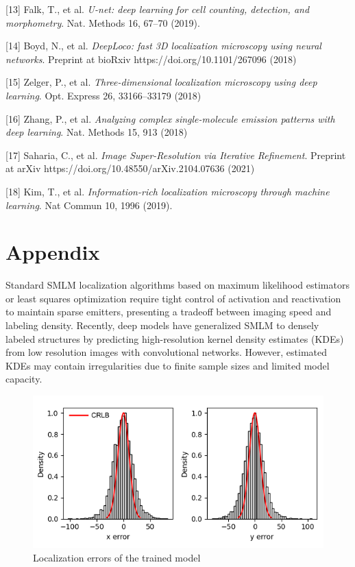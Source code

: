 \documentclass{article}
\begin{document}
{[13] Falk, T., et al. {\it U-net: deep learning for cell counting, detection, and morphometry}. Nat. Methods 16, 67–70 (2019).

[14] Boyd, N., et al. {\it DeepLoco: fast 3D localization microscopy using neural networks}. Preprint at bioRxiv https://doi.org/10.1101/267096 (2018)

[15] Zelger, P., et al. {\it Three-dimensional localization microscopy using deep learning}. Opt. Express 26, 33166–33179 (2018)

[16] Zhang, P., et al. {\it Analyzing complex single-molecule emission patterns with deep learning}. Nat. Methods 15, 913 (2018)

[17] Saharia, C., et al. {\it Image Super-Resolution via Iterative Refinement}. Preprint at arXiv https://doi.org/10.48550/arXiv.2104.07636 (2021)

[18] Kim, T., et al. {\it Information-rich localization microscopy through machine learning}. Nat Commun 10, 1996 (2019). 

}

\appendix

\section{Appendix}

Standard SMLM localization algorithms based on maximum likelihood estimators or least squares optimization require tight control of activation and reactivation to maintain sparse emitters, presenting a tradeoff between imaging speed and labeling density. Recently, deep models have generalized SMLM to densely labeled structures by predicting high-resolution kernel density estimates (KDEs) from low resolution images with convolutional networks. However, estimated KDEs may contain irregularities due to finite sample sizes and limited model capacity. 

\begin{figure}
\centering
\includegraphics[scale=0.7]{Errors.png}
\caption{Localization errors of the trained model}
\end{figure}
\end{document}
